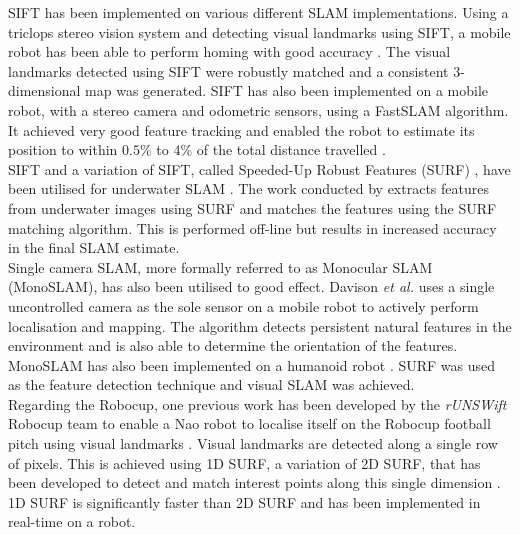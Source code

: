 SIFT has been implemented on various different SLAM implementations. Using a triclops stereo vision system and detecting visual landmarks using SIFT, a mobile robot has been able to perform homing with good accuracy \citep{Se2001, Se2002}. The visual landmarks detected using SIFT were robustly matched and a consistent 3-dimensional map was generated. SIFT has also been implemented on a mobile robot, with a stereo camera and odometric sensors, using a FastSLAM algorithm. It achieved very good feature tracking and enabled the robot to estimate its position to within $0.5\%$ to $4\%$ of the total distance travelled \citep{Barfoot2005}.\\

SIFT and a variation of SIFT, called Speeded-Up Robust Features (SURF) \citep{Bay2008}, have been utilised for underwater SLAM \citep{Aulinas2011, Thomas}. The work conducted by \citet{Aulinas2011} extracts features from underwater images using SURF and matches the features using the SURF matching algorithm. This is performed off-line but results in increased accuracy in the final SLAM estimate.\\

Single camera SLAM, more formally referred to as Monocular SLAM (MonoSLAM), has also been utilised to good effect. Davison \textit{et al.} \citep{Davison2007} uses a single uncontrolled camera as the sole sensor on a mobile robot to actively perform localisation and mapping. The algorithm detects persistent natural features in the environment and is also able to determine the orientation of the features. MonoSLAM has also been implemented on a humanoid robot \citep{Wang2011}. SURF was used as the feature detection technique and visual SLAM was achieved.\\

Regarding the Robocup, one previous work has been developed by the \textit{rUNSWift} Robocup team to enable a Nao robot to localise itself on the Robocup football pitch using visual landmarks \citep{Anderson}. Visual landmarks are detected along a single row of pixels. This is achieved using 1D SURF, a variation of 2D SURF, that has been developed to detect and match interest points along this single dimension \citep{Anderson}. 1D SURF is significantly faster than 2D SURF and has been implemented in real-time on a robot.\\

